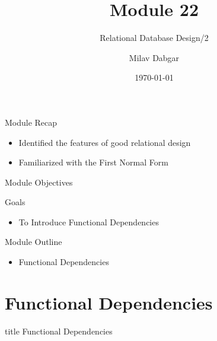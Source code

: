\documentclass[aspectratio=169, xcolor=dvipsnames]{beamer}
\title{Module 22}
\subtitle{Relational Database Design/2}
\author{Milav Dabgar}
\institute{www.milav.in}
\date{\today}
\begin{document}
\begin{frame}
    \titlepage
\end{frame}

\begin{frame}{Module Recap}
    \begin{itemize}[<+->]
        \item Identified the features of good relational design
        \item Familiarized with the First Normal Form
    \end{itemize}
\end{frame}

\begin{frame}{Module Objectives}
    \begin{block}{Goals}
        \begin{itemize}[<+->]
            \item To Introduce Functional Dependencies
        \end{itemize}
    \end{block}
\end{frame}

\begin{frame}{Module Outline}
    \begin{itemize}[<+->]
        \item Functional Dependencies
    \end{itemize}
\end{frame}

\section{Functional Dependencies}
\begin{frame}
  \vfill
  \centering
  \begin{beamercolorbox}[sep=8pt,center,shadow=true,rounded=true]{title}
    Functional Dependencies\par%
  \end{beamercolorbox}
  \vfill
\end{frame}
\end{document}
